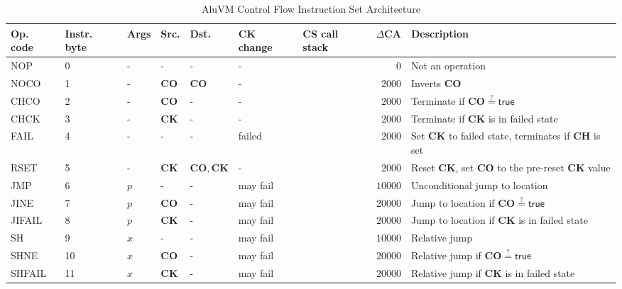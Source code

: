 \documentclass[9pt,oneside]{amsart}
\begin{document}
\begin{table}[h]
\centering
\caption{AluVM Control Flow Instruction Set Architecture}\label{tab:aluvm}
\begin{tabular}{l p{1cm} l p{1cm} p{1cm} p{1.5cm} p{1cm} r p{5cm}}
\toprule
Op. code & Instr. byte & Args & Src. & Dst. & \textbf{CK} change & \textbf{CS} call stack & $\Delta\mathbf{CA}$ & Description \\
\midrule
NOP	    &0	&-  	&-      		&-                              &-	        &		&$0$      &Not an operation \\ \midrule
NOCO	&1	&-  	&\textbf{CO}	&$\mathbf{CO}$	                &-	      	&		&$2000$   &Inverts \textbf{CO} \\ \midrule
CHCO	&2	&-  	&\textbf{CO}	&-                              &-	      	&	    &$2000$   &Terminate if $\mathbf{CO} \stackrel{?}{=} \mathsf{true}$ \\ \midrule
CHCK	&3	&-  	&\textbf{CK}	&-                              &-	      	&	    &$2000$   &Terminate if \textbf{CK} is in failed state \\ \midrule
FAIL	&4	&-  	&-         		&-                              &\textsf{failed} &	&$2000$   &Set \textbf{CK} to failed state, terminates if \textbf{CH} is set \\ \midrule
RSET	&5	&-  	&\textbf{CK}	&$\mathbf{CO}, \mathbf{CK}$	    &-	      	&		&$2000$   &Reset \textbf{CK}, set \textbf{CO} to the pre-reset \textbf{CK} value \\ \midrule
JMP	    &6	&$p$\ \footnotemark[1] &-	&-                              &may fail	&		&$10000$  &Unconditional jump to location \\ \midrule
JINE	&7	&$p$	&\textbf{CO}	&-                              &may fail	&		&$20000$  &Jump to location if $\mathbf{CO} \stackrel{?}{=} \mathsf{true}$ \\ \midrule
JIFAIL	&8	&$p$	&\textbf{CK}	&-                              &may fail	&		&$20000$  &Jump to location if \textbf{CK} is in failed state \\ \midrule
SH      &9	&$x$\ \footnotemark[2] &- &-                              &may fail	&		&$10000$  &Relative jump \\ \midrule
SHNE	&10	&$x$	&\textbf{CO}	&-                              &may fail	&		&$20000$  &Relative jump if $\mathbf{CO} \stackrel{?}{=} \mathsf{true}$ \\ \midrule
SHFAIL	&11	&$x$	&\textbf{CK}	&-                              &may fail	&		&$20000$  &Relative jump if \textbf{CK} is in failed state \\ \midrule

\end{tabular}
\end{table}
\end{document}
